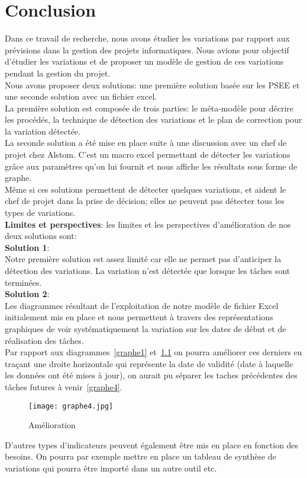\chapter{Conclusion} %

\label{Chapitre4} %

Dans ce travail de recherche, nous avons étudier les variations par rapport aux prévisions dans la gestion des projets informatiques. Nous avions pour objectif d'étudier les variations et de proposer un modèle de gestion de ces variations pendant la gestion du projet.\\
Nous avons proposer deux solutions: une première solution basée sur les PSEE et une seconde solution avec un fichier excel.\\
La première solution est composée de trois parties: le méta-modèle pour décrire les procédés, la technique de détection des variations et le plan de correction pour la variation détectée.\\
La seconde solution a été mise en place suite à une discussion avec un chef de projet chez Alstom. C'est un macro excel permettant de détecter les variations grâce aux paramètres qu'on lui fournit et nous affiche les résultats sous forme de graphe. \\
Même si ces solutions permettent de détecter quelques variations, et aident le chef de projet dans la prise de décision; elles ne peuvent pas détecter tous les types de variations.\\
\textbf{Limites et perspectives}: les limites et les perspectives d'amélioration de nos deux solutions sont:\\
\textbf{Solution 1}:\\
Notre première solution est assez limité car elle ne permet pas d'anticiper la détection des variations. La variation n'est détectée que lorsque les tâches sont terminées.\\
\textbf{Solution 2}:\\
Les diagrammes résultant de l'exploitation de notre modèle de fichier Excel initialement mis en place et nous permettent à travers des représentations graphiques de voir systématiquement la variation sur les dates de début et de réalisation des tâches. \\
Par rapport aux diagrammes~\ref{graphe1} et~\ref{graphe2} on pourra améliorer ces derniers en traçant une droite horizontale qui représente la date de validité (date à laquelle les données ont été mises à jour), on aurait pu séparer les taches précédentes des tâches futures à venir~\ref{graphe4}.
\begin{figure}[h]
\centering
\texttt{[image: graphe4.jpg]}
\caption{\label{graphe2}Amélioration}
\end{figure}
D'autres types d'indicateurs peuvent également être mis en  place en fonction des besoins. On pourra par exemple mettre en place un tableau de synthèse de variations qui pourra être importé dans un autre outil etc.
